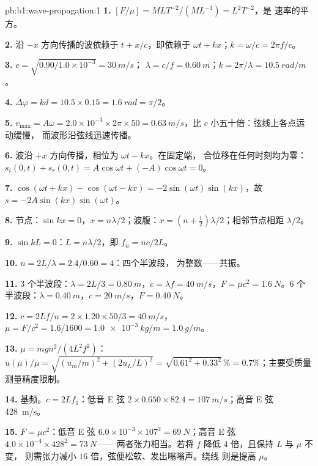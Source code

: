 \begin{solution}{pb:b1:wave-propagation:1}
\textbf{1.} $[F/\mu] = M L T^{-2}/(M L^{-1}) = L^2 T^{-2}$，是
速率的平方。

\textbf{2.} 沿 $-x$ 方向传播的波依赖于 $t + x/c$，即依赖于
$\omega t + kx$；$k = \omega/c = 2\pi f/c$。

\textbf{3.} $c = \sqrt{0.90/1.0\times10^{-3}} = \qty{30}{m/s}$；
$\lambda = c/f = \qty{0.60}{m}$；$k = 2\pi/\lambda = \qty{10.5}{rad/m}$。

\textbf{4.} $\Delta\varphi = kd = 10.5 \times 0.15 = \qty{1.6}{rad} = \pi/2$。

\textbf{5.} $v_{\max} = A\omega = 2.0\times10^{-3} \times 2\pi \times 50 =
\qty{0.63}{m/s}$，比 $c$ 小五十倍：弦线上各点运动缓慢，
而波形沿弦线迅速传播。

\textbf{6.} 波沿 $+x$ 方向传播，相位为 $\omega t - kx$。在固定端，
合位移在任何时刻均为零：$s_i(0, t) + s_r(0, t)
= A\cos\omega t + (-A)\cos\omega t = 0$。

\textbf{7.} $\cos(\omega t + kx) - \cos(\omega t - kx) =
-2\sin(\omega t)\sin(kx)$，故 $s = -2A\sin(kx)\sin(\omega t)$。

\textbf{8.} 节点：$\sin kx = 0$，$x = n\lambda/2$；波腹：$x = (n +
\tfrac12)\lambda/2$；相邻节点相距 $\lambda/2$。

\textbf{9.} $\sin kL = 0$：$L = n\lambda/2$，即 $f_n = nc/2L$。

\textbf{10.} $n = 2L/\lambda = 2.4/0.60 = 4$：四个半波段，
为整数——共振。

\textbf{11.} $3$ 个半波段：$\lambda = 2L/3 = \qty{0.80}{m}$，$c = \lambda f
= \qty{40}{m/s}$，$F = \mu c^2 = \qty{1.6}{N}$。$6$ 个半波段：$\lambda =
\qty{0.40}{m}$，$c = \qty{20}{m/s}$，$F = \qty{0.40}{N}$。

\textbf{12.} $c = 2Lf/n = 2 \times 1.20 \times 50/3 = \qty{40}{m/s}$，
$\mu = F/c^2 = 1.6/1600 = \qty{1.0e-3}{kg/m} = \qty{1.0}{g/m}$。

\textbf{13.} $\mu = mgn^2/(4L^2f^2)$：$u(\mu)/\mu = \sqrt{(u_m/m)^2 +
(2u_L/L)^2} = \sqrt{0.61^2 + 0.33^2}\,\% = 0.7\%$；主要受质量测量精度限制。

\textbf{14.} 基频。$c = 2Lf_1$：低音 E 弦 $2 \times 0.650 \times
82.4 = \qty{107}{m/s}$；高音 E 弦 \qty{428}{m/s}。

\textbf{15.} $F = \mu c^2$：低音 E 弦 $6.0\times10^{-3} \times 107^2 =
\qty{69}{N}$；高音 E 弦 $4.0\times10^{-4} \times 428^2 = \qty{73}{N}$——
两者张力相当。若将 $f$ 降低 $4$ 倍，且保持 $L$ 与 $\mu$ 不变，
则需张力减小 $16$ 倍，弦便松软、发出嗡嗡声。绕线
则是提高 $\mu$。


\end{solution}
